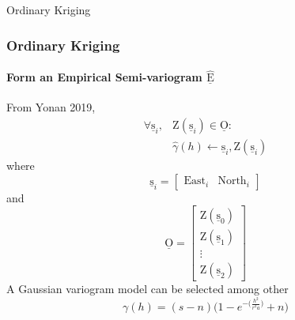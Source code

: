 \documentclass[professionalfont,10pt]{beamer}
\begin{document}
	\begin{frame}[t]{Ordinary Kriging}
		\frametitle{Ordinary Kriging}
		\framesubtitle{Form an Empirical Semi-variogram $\hat{\underline{\text{E}}}$}
		\hskip-0.75cm
		\begin{minipage}[t]{0.2\linewidth}\vspace{-0.5cm}
			\tiny\tableofcontents[currentsection,currentsubsection,hideothersubsections,subsectionstyle=show/shaded]
		\end{minipage}
		\hfill%
		\begin{minipage}[t]{0.86\linewidth}\vspace{-0.5cm}
			From Yonan 2019,
			\begin{align*}
				\forall \underline{\text{s}}_i,& \text{Z}(\underline{\text{s}}_i) \in \underline{\text{O}}:\\
				& \hat{\gamma}(h) \leftarrow \underline{\text{s}}_i, \text{Z}(\underline{\text{s}}_i)
			\end{align*}
			where 
			\begin{equation*}
				\underline{\text{s}}_i = 
				\left[\begin{array}{cc}
					\text{East}_i & \text{North}_i
				\end{array}\right]
			\end{equation*}
			and
			\begin{equation}\label{}
			\underline{\text{O}}
			=
			\left[\begin{array}{c}
				\text{Z}(\underline{\text{s}}_0)\\
				\text{Z}(\underline{\text{s}}_1)\\
				\vdots\\
				\text{Z}(\underline{\text{s}}_2)
				\end{array}\right]
			\end{equation}
			A Gaussian variogram model can be selected among other
			\begin{equation}
				\gamma(h) = (s-n)\bigg(1-e^{-\big(\frac{h^2}{r^2a}\big)} + n\bigg)
			\end{equation}
		\end{minipage}
		\vfill%
	\end{frame}
\end{document}
